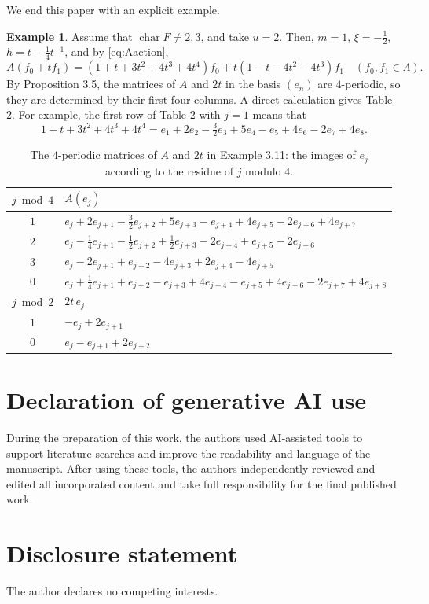 \documentclass[11pt,reqno,a4paper]{amsart}
\numberwithin{equation}{section}
\theoremstyle{definition}
\newtheorem{example}[theorem]{Example}
\theoremstyle{plain}
\newcommand{\ch}{\operatorname{char}}
\begin{document}
We end this paper with an explicit example.

\begin{example}
Assume that $\ch F\ne2,3$, and take $u=2$. Then, $m=1$, $\xi=-\frac12$, $h=t-\frac14t^{-1}$, and by \eqref{eq:Aaction},
\[
A(f_0+tf_1)=(1+t+3t^2+4t^3+4t^4)f_0+t(1-t-4t^2-4t^3)f_1\quad(f_0,f_1\in\Lambda).
\]
By Proposition 3.5, the matrices of $A$ and $2t$ in the basis $(e_n)$ are $4$-periodic, so they are determined by their first four columns. A direct calculation gives Table 2. For example, the first row of Table 2 with $j=1$ means that
\[
1+t+3t^2+4t^3+4t^4=e_1+2e_2-\tfrac32e_3+5e_4-e_5+4e_6-2e_7+4e_8.
\]
\end{example}

\begin{table}[H]
\centering
\caption{The $4$-periodic matrices of $A$ and $2t$ in Example 3.11: the images of $e_j$ according to the residue of $j$ modulo $4$.}
\label{tab:explicit}
\small
\renewcommand{\arraystretch}{1.3}
\begin{tabular}{@{}c@{\quad}p{}@{}}
$j\bmod4$ & $A(e_j)$\\\hline
$1$ & $e_j+2e_{j+1}-\tfrac32e_{j+2}+5e_{j+3}-e_{j+4}+4e_{j+5}-2e_{j+6}+4e_{j+7}$\\
$2$ & $e_j-\tfrac14e_{j+1}-\tfrac12e_{j+2}+\tfrac12e_{j+3}-2e_{j+4}+e_{j+5}-2e_{j+6}$\\
$3$ & $e_j-2e_{j+1}+e_{j+2}-4e_{j+3}+2e_{j+4}-4e_{j+5}$\\
$0$ & $e_j+\tfrac14e_{j+1}+e_{j+2}-e_{j+3}+4e_{j+4}-e_{j+5}+4e_{j+6}-2e_{j+7}+4e_{j+8}$\\[2pt]
$j\bmod2$ & $2t\,e_j$\\\hline
$1$ & $-e_j+2e_{j+1}$\\
$0$ & $e_j-e_{j+1}+2e_{j+2}$
\end{tabular}
\end{table}

\section*{Declaration of generative AI use}
During the preparation of this work, the authors used AI-assisted tools to support literature searches and improve the readability and language of the manuscript. After using these tools, the authors independently reviewed and edited all incorporated content and take full responsibility for the final published work.

\section*{Disclosure statement}
The author declares no competing interests.
\end{document}
